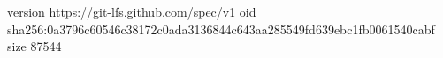 version https://git-lfs.github.com/spec/v1
oid sha256:0a3796c60546c38172c0ada3136844c643aa285549fd639ebc1fb0061540cabf
size 87544
